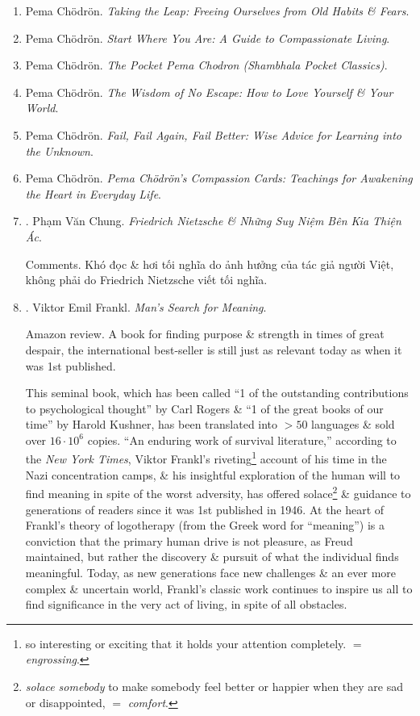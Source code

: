 \documentclass{article}
\begin{document}
\begin{enumerate}
	\item {\sc Pema Ch\"odr\"on}. {\it Taking the Leap: Freeing Ourselves from Old Habits \& Fears}.
	
	\item {\sc Pema Ch\"odr\"on}. {\it Start Where You Are: A Guide to Compassionate Living}.
	
	\item {\sc Pema Ch\"odr\"on}. {\it The Pocket Pema Chodron (Shambhala Pocket Classics)}.
	
	\item {\sc Pema Ch\"odr\"on}. {\it The Wisdom of No Escape: How to Love Yourself \& Your World}.
	
	\item {\sc Pema Ch\"odr\"on}. {\it Fail, Fail Again, Fail Better: Wise Advice for Learning into the Unknown}.
	
	\item {\sc Pema Ch\"odr\"on}. {\it{\sc Pema Ch\"odr\"on}'s Compassion Cards: Teachings for Awakening the Heart in Everyday Life}.
	
	\item \cite{Chung2022}. Phạm Văn Chung. {\it Friedrich Nietzsche \& Những Suy Niệm Bên Kia Thiện Ác}.\hfill{\sf[done]}
	
	{\sf Comments.} Khó đọc \& hơi tối nghĩa do ảnh hưởng của tác giả người Việt, không phải do {\sc Friedrich Nietzsche} viết tối nghĩa.
	
	\item \cite{Frankl_meaning}. {\sc Viktor Emil Frankl}. {\it Man's Search for Meaning}.\hfill{\sf[reading]}
	
	{\sf Amazon review.} A book for finding purpose \& strength in times of great despair, the international best-seller is still just as relevant today as when it was 1st published.
	
	This seminal book, which has been called ``1 of the outstanding contributions to psychological thought'' by {\sc Carl Rogers} \& ``1 of the great books of our time'' by {\sc Harold Kushner}, has been translated into $> 50$ languages \& sold over $16\cdot10^6$ copies. ``An enduring work of survival literature,'' according to the {\it New York Times}, {\sc Viktor Frankl}'s riveting\footnote{so interesting or exciting that it holds your attention completely. $=$ {\it engrossing}.} account of his time in the Nazi concentration camps, \& his insightful exploration of the human will to find meaning in spite of the worst adversity, has offered solace\footnote{{\it solace somebody} to make somebody feel better or happier when they are sad or disappointed, $=$ {\it comfort}.} \& guidance to generations of readers since it was 1st published in 1946. At the heart of {\sc Frankl}'s theory of logotherapy (from the Greek word for ``meaning'') is a conviction that the primary human drive is not pleasure, as {\sc Freud} maintained, but rather the discovery \& pursuit of what the individual finds meaningful. Today, as new generations face new challenges \& an ever more complex \& uncertain world, {\sc Frankl}'s classic work continues to inspire us all to find significance in the very act of living, in spite of all obstacles.
	

\end{enumerate}
\end{document}

